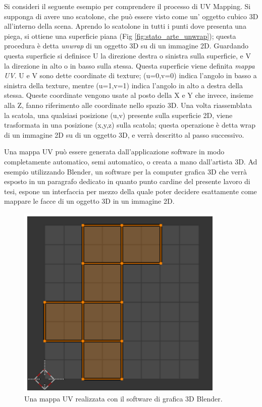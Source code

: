 Si consideri il seguente esempio per comprendere il processo di UV Mapping.
Si supponga di avere uno scatolone, che può essere visto come un’ oggetto cubico 3D all’interno della scena. Aprendo lo scatolone in tutti i punti dove presenta una piega, si ottiene una superficie piana (Fig \ref{fig:stato_arte_unwrap}); questa procedura è detta \emph{unwrap} di un oggetto 3D su di un immagine 2D. Guardando questa superficie si definisce U la direzione destra o sinistra sulla superficie, e V la direzione in alto o in basso sulla stessa. Questa superficie viene definita \emph{mappa UV}. U e V sono dette coordinate di texture; (u=0,v=0) indica l’angolo in basso a sinistra della texture, mentre (u=1,v=1) indica l’angolo in alto a destra della stessa. Queste coordinate vengono usate al posto della X e Y che invece, insieme alla Z, fanno riferimento alle coordinate nello spazio 3D. Una volta riassemblata la scatola, una qualsiasi posizione (u,v) presente sulla superficie 2D, viene trasformata in una posizione (x,y,z) sulla scatola; questa operazione è detta wrap di un immagine 2D su di un oggetto 3D, e verrà descritto al passo successivo.

Una mappa UV può essere generata dall’applicazione software in modo completamente automatico, semi automatico, o creata a mano dall’artista 3D. Ad esempio utilizzando Blender, 
un software per la computer grafica 3D che verrà esposto in un paragrafo dedicato in quanto punto cardine del presente lavoro di tesi, espone un interfaccia per mezzo della quale poter decidere esattamente come mappare le facce di un oggetto 3D in un immagine 2D. 
\\
\begin{figure}[htb]
 \centering
 \includegraphics[width=0.5\linewidth]{images/chapter_stato_arte/stato_arte_uvmap_blender.png}\hfill
 \caption[Mappa UV realizzata in Blender]{Una mappa UV realizzata con il software di grafica 3D Blender.}
 \label{fig:stato_arte_uvmap_blender}
\end{figure}

